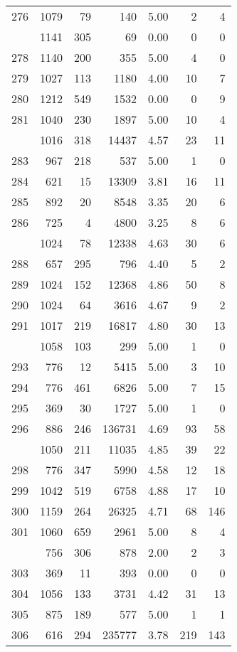 \documentclass[
]{article}
\begin{document}
\begin{table}
\begin{tabular}[t]{lrrrrrr}
276 & 1079 & 79 & 140 & 5.00 & 2 & 4\\
\addlinespace
277 & 1141 & 305 & 69 & 0.00 & 0 & 0\\
278 & 1140 & 200 & 355 & 5.00 & 4 & 0\\
279 & 1027 & 113 & 1180 & 4.00 & 10 & 7\\
280 & 1212 & 549 & 1532 & 0.00 & 0 & 9\\
281 & 1040 & 230 & 1897 & 5.00 & 10 & 4\\
\addlinespace
282 & 1016 & 318 & 14437 & 4.57 & 23 & 11\\
283 & 967 & 218 & 537 & 5.00 & 1 & 0\\
284 & 621 & 15 & 13309 & 3.81 & 16 & 11\\
285 & 892 & 20 & 8548 & 3.35 & 20 & 6\\
286 & 725 & 4 & 4800 & 3.25 & 8 & 6\\
\addlinespace
287 & 1024 & 78 & 12338 & 4.63 & 30 & 6\\
288 & 657 & 295 & 796 & 4.40 & 5 & 2\\
289 & 1024 & 152 & 12368 & 4.86 & 50 & 8\\
290 & 1024 & 64 & 3616 & 4.67 & 9 & 2\\
291 & 1017 & 219 & 16817 & 4.80 & 30 & 13\\
\addlinespace
292 & 1058 & 103 & 299 & 5.00 & 1 & 0\\
293 & 776 & 12 & 5415 & 5.00 & 3 & 10\\
294 & 776 & 461 & 6826 & 5.00 & 7 & 15\\
295 & 369 & 30 & 1727 & 5.00 & 1 & 0\\
296 & 886 & 246 & 136731 & 4.69 & 93 & 58\\
\addlinespace
297 & 1050 & 211 & 11035 & 4.85 & 39 & 22\\
298 & 776 & 347 & 5990 & 4.58 & 12 & 18\\
299 & 1042 & 519 & 6758 & 4.88 & 17 & 10\\
300 & 1159 & 264 & 26325 & 4.71 & 68 & 146\\
301 & 1060 & 659 & 2961 & 5.00 & 8 & 4\\
\addlinespace
302 & 756 & 306 & 878 & 2.00 & 2 & 3\\
303 & 369 & 11 & 393 & 0.00 & 0 & 0\\
304 & 1056 & 133 & 3731 & 4.42 & 31 & 13\\
305 & 875 & 189 & 577 & 5.00 & 1 & 1\\
306 & 616 & 294 & 235777 & 3.78 & 219 & 143\\

\end{tabular}
\end{table}
\end{document}
